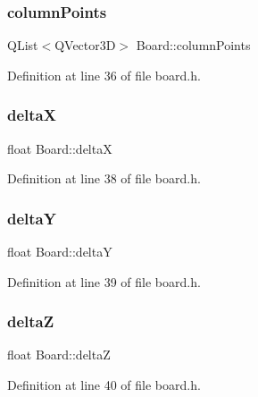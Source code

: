 \subsubsection{\texorpdfstring{columnPoints}{columnPoints}}
{\footnotesize\ttfamily Q\+List$<$Q\+Vector3D$>$ Board\+::column\+Points\hspace{0.3cm}{\ttfamily [protected]}}



Definition at line 36 of file board.\+h.

\mbox{\label{class_board_acc78f2a614333d03e59d3008b841f164}} 
\subsubsection{\texorpdfstring{deltaX}{deltaX}}
{\footnotesize\ttfamily float Board\+::deltaX\hspace{0.3cm}{\ttfamily [protected]}}



Definition at line 38 of file board.\+h.

\mbox{\label{class_board_a44ba33a6896a37b3c18175b20fd6f3f6}} 
\subsubsection{\texorpdfstring{deltaY}{deltaY}}
{\footnotesize\ttfamily float Board\+::deltaY\hspace{0.3cm}{\ttfamily [protected]}}



Definition at line 39 of file board.\+h.

\mbox{\label{class_board_a86cfe659af51a4619e2b73bdbc1a9d1f}} 
\subsubsection{\texorpdfstring{deltaZ}{deltaZ}}
{\footnotesize\ttfamily float Board\+::deltaZ\hspace{0.3cm}{\ttfamily [protected]}}



Definition at line 40 of file board.\+h.

